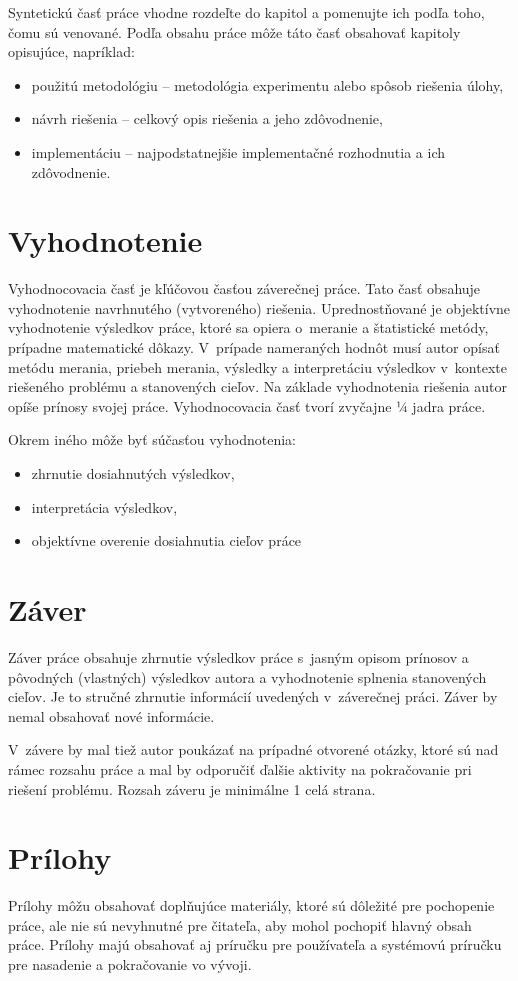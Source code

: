 Syntetickú časť práce vhodne rozdeľte do kapitol a pomenujte ich podľa toho, čomu sú venované. Podľa obsahu práce môže táto časť obsahovať kapitoly opisujúce, napríklad:

\begin{itemize}
  \item použitú metodológiu -- metodológia experimentu alebo spôsob riešenia úlohy,
  \item návrh riešenia -- celkový opis riešenia a jeho zdôvodnenie,
  \item implementáciu -- najpodstatnejšie implementačné rozhodnutia a ich zdôvodnenie.
\end{itemize}


\section*{Vyhodnotenie}

Vyhodnocovacia časť je kľúčovou časťou záverečnej práce. Tato časť obsahuje vyhodnotenie navrhnutého (vytvoreného) riešenia. Uprednostňované je objektívne vyhodnotenie výsledkov práce, ktoré sa opiera o~meranie a štatistické metódy, prípadne matematické dôkazy. V~prípade nameraných hodnôt musí autor opísať metódu merania, priebeh merania, výsledky a interpretáciu výsledkov v~kontexte riešeného problému a stanovených cieľov. Na základe vyhodnotenia riešenia autor opíše prínosy svojej práce. Vyhodnocovacia časť tvorí zvyčajne ¼ jadra práce.

Okrem iného môže byť súčasťou vyhodnotenia:
\begin{itemize}
  \item zhrnutie dosiahnutých výsledkov,
  \item interpretácia výsledkov,
  \item objektívne overenie dosiahnutia cieľov práce
\end{itemize}


\section*{Záver}

Záver práce obsahuje zhrnutie výsledkov práce s~jasným opisom prínosov a pôvodných (vlastných) výsledkov autora a vyhodnotenie splnenia stanovených cieľov. Je to stručné zhrnutie informácií uvedených v~záverečnej práci. Záver by nemal obsahovať nové informácie.

V~závere by mal tiež autor poukázať na prípadné otvorené otázky, ktoré sú nad rámec rozsahu práce a mal by odporučiť ďalšie aktivity na pokračovanie pri riešení problému. Rozsah záveru je minimálne 1 celá strana.


\section*{Prílohy}

Prílohy môžu obsahovať doplňujúce materiály, ktoré sú dôležité pre pochopenie práce, ale nie sú nevyhnutné pre čitateľa, aby mohol pochopiť hlavný obsah práce. Prílohy majú obsahovať aj príručku pre používateľa a systémovú príručku pre nasadenie a pokračovanie vo vývoji.
